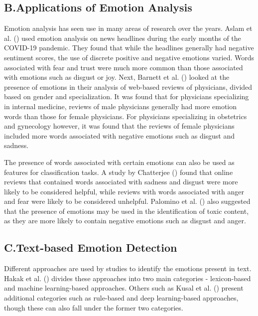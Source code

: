 \documentclass{icsthesis}
\begin{document}
\begin{mainmatter}
            \subsection{B.\hspace{0.5cm}Applications of Emotion Analysis}
                Emotion analysis has seen use in many areas of research over the years. Aslam et al. (\citeyear{Aslam1}) used emotion analysis on news headlines during the early months of the COVID-19 pandemic. They found that while the headlines generally had negative sentiment scores, the use of discrete positive and negative emotions varied. Words associated with fear and trust were much more common than those associated with emotions such as disgust or joy. Next, Barnett et al. (\citeyear{Barnett1}) looked at the presence of emotions in their analysis of web-based reviews of physicians, divided based on gender and specialization. It was found that for physicians specializing in internal medicine, reviews of male physicians generally had more emotion words than those for female physicians. For physicians specializing in obstetrics and gynecology however, it was found that the reviews of female physicians included more words associated with negative emotions such as disgust and sadness.
                
                The presence of words associated with certain emotions can also be used as features for classification tasks. A study by Chatterjee (\citeyear{Chatterjee1}) found that online reviews that contained words associated with sadness and disgust were more likely to be considered helpful, while reviews with words associated with anger and fear were likely to be considered unhelpful. Palomino et al. (\citeyear{Palomino1}) also suggested that the presence of emotions may be used in the identification of toxic content, as they are more likely to contain negative emotions such as disgust and anger. 
                
            \subsection{C.\hspace{0.5cm}Text-based Emotion Detection}
                Different approaches are used by studies to identify the emotions present in text. Hakak et al. (\citeyear{Hakak1}) divides these approaches into two main categories - lexicon-based and machine learning-based approaches. Others such as Kusal et al. (\citeyear{Kusal1}) present additional categories such as rule-based and deep learning-based approaches, though these can also fall under the former two categories.
                

\end{mainmatter}
\end{document}
